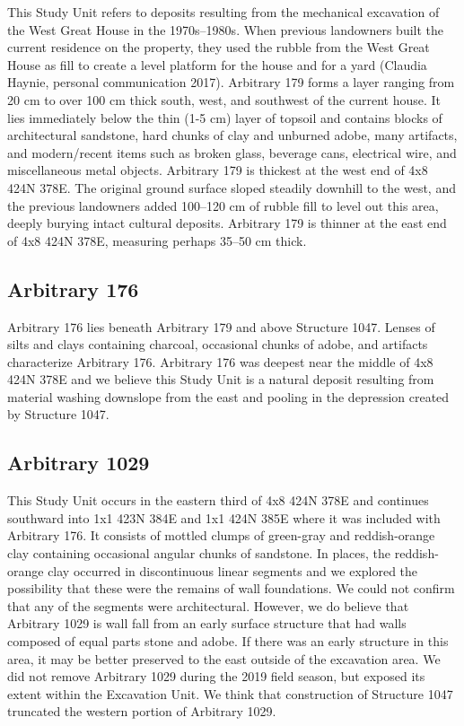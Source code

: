 \documentclass[
  12pt,
]{krantz}
\begin{document}
This Study Unit refers to deposits resulting from the mechanical
excavation of the West Great House in the 1970s--1980s. When previous
landowners built the current residence on the property, they used the
rubble from the West Great House as fill to create a level platform for
the house and for a yard (Claudia Haynie, personal communication 2017).
Arbitrary 179 forms a layer ranging from 20 cm to over 100 cm thick
south, west, and southwest of the current house. It lies immediately
below the thin (1-5 cm) layer of topsoil and contains blocks of
architectural sandstone, hard chunks of clay and unburned adobe, many
artifacts, and modern/recent items such as broken glass, beverage cans,
electrical wire, and miscellaneous metal objects. Arbitrary 179 is
thickest at the west end of 4x8 424N 378E. The original ground surface
sloped steadily downhill to the west, and the previous landowners added
100--120 cm of rubble fill to level out this area, deeply burying intact
cultural deposits. Arbitrary 179 is thinner at the east end of 4x8 424N
378E, measuring perhaps 35--50 cm thick.

\hypertarget{arbitrary-176}{%
\subsection{Arbitrary 176}\label{arbitrary-176}}

Arbitrary 176 lies beneath Arbitrary 179 and above Structure 1047.
Lenses of silts and clays containing charcoal, occasional chunks of
adobe, and artifacts characterize Arbitrary 176. Arbitrary 176 was
deepest near the middle of 4x8 424N 378E and we believe this Study Unit
is a natural deposit resulting from material washing downslope from the
east and pooling in the depression created by Structure 1047.

\hypertarget{arbitrary-1029}{%
\subsection{Arbitrary 1029}\label{arbitrary-1029}}

This Study Unit occurs in the eastern third of 4x8 424N 378E and
continues southward into 1x1 423N 384E and 1x1 424N 385E where it was
included with Arbitrary 176. It consists of mottled clumps of green-gray
and reddish-orange clay containing occasional angular chunks of
sandstone. In places, the reddish-orange clay occurred in discontinuous
linear segments and we explored the possibility that these were the
remains of wall foundations. We could not confirm that any of the
segments were architectural. However, we do believe that Arbitrary 1029
is wall fall from an early surface structure that had walls composed of
equal parts stone and adobe. If there was an early structure in this
area, it may be better preserved to the east outside of the excavation
area. We did not remove Arbitrary 1029 during the 2019 field season, but
exposed its extent within the Excavation Unit. We think that
construction of Structure 1047 truncated the western portion of
Arbitrary 1029.
\end{document}
